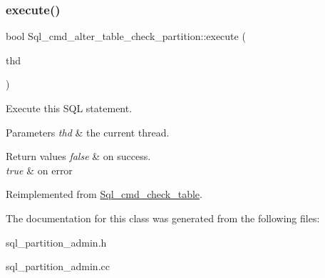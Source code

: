 \subsubsection{\texorpdfstring{execute()}{execute()}}
{\footnotesize\ttfamily bool Sql\+\_\+cmd\+\_\+alter\+\_\+table\+\_\+check\+\_\+partition\+::execute (\begin{DoxyParamCaption}\item[{T\+HD $\ast$}]{thd }\end{DoxyParamCaption})\hspace{0.3cm}{\ttfamily [virtual]}}

Execute this S\+QL statement. 
\begin{DoxyParams}{Parameters}
{\em thd} & the current thread. \\
\hline
\end{DoxyParams}

\begin{DoxyRetVals}{Return values}
{\em false} & on success. \\
\hline
{\em true} & on error \\
\hline
\end{DoxyRetVals}


Reimplemented from \mbox{\hyperlink{classSql__cmd__check__table_a05c38a51158692165f18f7c16199c468}{Sql\+\_\+cmd\+\_\+check\+\_\+table}}.



The documentation for this class was generated from the following files\+:\begin{DoxyCompactItemize}
\item 
sql\+\_\+partition\+\_\+admin.\+h\item 
sql\+\_\+partition\+\_\+admin.\+cc\end{DoxyCompactItemize}
